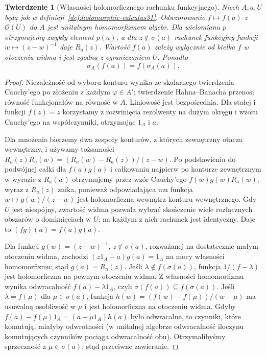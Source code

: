 \documentclass[11pt,a4paper]{article}
\numberwithin{equation}{section}
\theoremstyle{plain}
\newtheorem{twierdzenie}{Twierdzenie}[section]
\theoremstyle{definition}
\theoremstyle{remark}
\begin{document}
\begin{twierdzenie}[Własności holomorficznego rachunku funkcyjnego]
\label{thm:holomorphic-calculus31}
Niech $A,a,U$ będą jak w definicji~\ref{def:holomorphic-calculus31}.
Odwzorowanie $f\mapsto f(a)$ z $\mathcal O(U)$ do $A$ jest unitalnym
homomorfizmem algebr. Dla wielomianu $p$ otrzymujemy zwykły element
$p(a)$, a dla $z\notin\sigma(a)$ rachunek funkcyjny funkcji
$w\mapsto(z-w)^{-1}$ daje $R_a(z)$. Wartość $f(a)$ zależy wyłącznie
od kiełka $f$ w otoczeniu widma i jest zgodna z ograniczaniem $U$.
Ponadto
\[
 \sigma_A(f(a))=f(\sigma_A(a)).
\]
\end{twierdzenie}
\begin{proof}
Niezależność od wyboru konturu wynika ze skalarnego twierdzenia
Cauchy'ego po złożeniu z każdym $\varphi\in A'$; twierdzenie
Hahna--Banacha przenosi równość funkcjonałów na równość w $A$.
Liniowość jest bezpośrednia. Dla stałej i funkcji $f(z)=z$
korzystamy z rozwinięcia rezolwenty na dużym okręgu i wzoru
Cauchy'ego na współczynniki, otrzymując $1_A$ i $a$.

Dla mnożenia bierzemy dwa zespoły konturów, z których zewnętrzny
otacza wewnętrzny, i używamy tożsamości
$R_a(z)R_a(w)=(R_a(w)-R_a(z))/(z-w)$.
Po podstawieniu do podwójnej całki dla $f(a)g(a)$
i całkowaniu najpierw po konturze zewnętrznym w wyrazie z $R_a(w)$
otrzymujemy przez wzór Cauchy'ego $f(w)g(w)R_a(w)$;
wyraz z $R_a(z)$ znika, ponieważ odpowiadająca mu funkcja
$w\mapsto g(w)/(z-w)$ jest holomorficzna wewnątrz konturu
wewnętrznego. Gdy $U$ jest niespójny, zwartość widma pozwala wybrać
skończenie wiele rozłącznych obszarów o domknięciach w $U$;
na każdym z nich rachunek jest identyczny.
Daje to $(fg)(a)=f(a)g(a)$.

Dla funkcji $g(w)=(z-w)^{-1}$, $z\notin\sigma(a)$,
rozważanej na dostatecznie małym otoczeniu widma, zachodzi $(z1_A-a)g(a)=1_A$ na mocy własności homomorfizmu;
stąd $g(a)=R_a(z)$.
Jeśli $\lambda\notin f(\sigma(a))$, funkcja
$1/(f-\lambda)$ jest holomorficzna na pewnym otoczeniu widma.
Z własności homomorfizmu wynika odwracalność
$f(a)-\lambda1_A$, czyli $\sigma(f(a))\subseteq f(\sigma(a))$.
Jeśli $\lambda=f(\mu)$ dla $\mu\in\sigma(a)$,
funkcja $h(w)=(f(w)-f(\mu))/(w-\mu)$ ma usuwalną
osobliwość w $\mu$ i jest holomorficzna na otoczeniu widma.
Gdyby $f(a)-f(\mu)1_A=(a-\mu1_A)h(a)$ było odwracalne,
to czynniki, które komutują, miałyby odwrotności
(w unitalnej algebrze odwracalność iloczynu komutujących czynników
pociąga odwracalność obu). Otrzymalibyśmy sprzeczność
z $\mu\in\sigma(a)$; stąd przeciwne zawieranie.
\end{proof}
\end{document}
